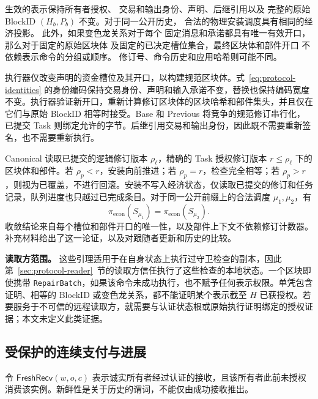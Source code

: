 \begin{lemma}[身份保持与安装独立性]
\label{lem:security-installation}
生效的表示保持所有者授权、
交易和输出身份、声明、后继引用以及
完整的原始 BlockID $(H_b,P_b)$ 不变。对于同一公开历史，
合法的物理安装调度具有相同的经济投影。
此外，如果变色龙关系对于每个
固定消息和承诺都具有唯一有效开口，那么对于固定的原始区块体
及固定的已决定槽位集合，最终区块体和部件开口
不依赖表示命令的分组或顺序。
修订号、命令历史和应用哈希则可能不同。
\end{lemma}
\begin{IEEEproof}
执行器仅改变声明的资金槽位及其开口，以构建规范区块体。式~\eqref{eq:protocol-identities} 的身份编码保持交易身份、声明和输入承诺不变，替换也保持编码宽度不变。执行器验证新开口，重新计算修订区块体的区块哈希和部件集头，并且仅在它们与原始 BlockID 相等时接受。Base 和 Previous 将竞争的规范修订串行化，已提交 Task 则绑定允许的字节。后继引用交易和输出身份，因此既不需要重新签名，也不需要重新执行。

Canonical 读取已提交的逻辑修订版本 $\rho_\ell$，精确的 Task 授权修订版本 $r\le\rho_\ell$ 下的区块体和部件。若 $\rho_p<r$，安装向前推进；若 $\rho_p=r$，检查完全相等；若 $\rho_p>r$，则视为已覆盖，不进行回滚。安装不写入经济状态，仅读取已提交的修订和任务记录，队列进度也只越过已完成条目。对于同一公开前缀上的合法调度 $\mu_1,\mu_2$，有
\begin{equation}
 \pi_{\mathrm{econ}}(S_{\mu_1})=\pi_{\mathrm{econ}}(S_{\mu_2}).
 \label{eq:security-installation}
\end{equation}
收敛结论来自每个槽位和部件开口的唯一性，以及部件上下文不依赖修订计数器。补充材料给出了这一论证，以及对跟随者更新和历史的比较。
\end{IEEEproof}

\noindent\textbf{读取方范围。}
这些引理适用于在自身状态上执行过守卫检查的副本，因此第~\ref{sec:protocol-reader}~节的读取方信任执行了这些检查的本地状态。一个区块即使携带 \texttt{RepairBatch}，如果该命令未成功执行，也不赋予任何表示权限。单凭包含证明、相等的 BlockID 或变色龙关系，都不能证明某个表示截至 $H$ 已获授权。若要服务于不可信的远程读取方，就需要与认证状态根或原始执行证明绑定的授权证据；本文未定义此类证据。

\subsection{受保护的连续支付与进展}
\label{sec:security-composition}

令 $\mathsf{FreshRecv}(w,o,c)$ 表示诚实所有者经过认证的接收，且该所有者此前未授权消费该实例。新鲜性是关于历史的谓词，不能仅由成功接收推出。

